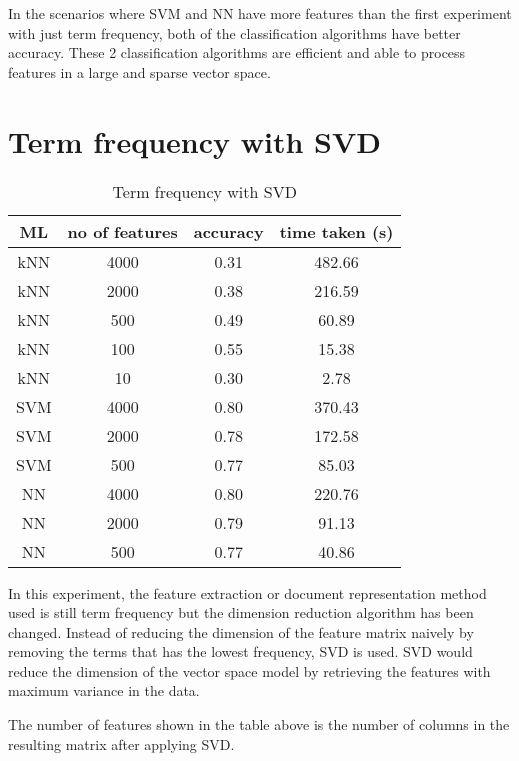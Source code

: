 In the scenarios where SVM and NN have more features than the first experiment with just term frequency, both of the classification algorithms have better accuracy. These 2 classification algorithms are efficient and able to process features in a large and sparse vector space.


\clearpage
\section{Term frequency with SVD}

\begin{table} [ht]
	\centering
	\begin{tabular}{|| c | c | c | c||}
		\hline
		ML & no of features & accuracy & time taken (s) \\ [0.5ex]
		\hline\hline
		kNN & 4000 & 0.31 & 482.66 \\
		\hline
		kNN & 2000 & 0.38 & 216.59 \\ 
		\hline
		kNN & 500 & 0.49 & 60.89 \\ 
		\hline
		kNN & 100 & 0.55 & 15.38 \\ 
		\hline
		kNN & 10 & 0.30 & 2.78 \\ 
		\hline\hline
		SVM & 4000 & 0.80 & 370.43 \\
		\hline
		SVM & 2000 & 0.78 & 172.58 \\
		\hline
		SVM & 500 & 0.77 & 85.03 \\
		\hline\hline
		NN & 4000 & 0.80 & 220.76 \\
		\hline
		NN & 2000 & 0.79 & 91.13 \\
		\hline
		NN & 500 & 0.77 & 40.86 \\
		\hline
	\end{tabular}
\caption{Term frequency with SVD}
\label{tbl:termFrequencySvd}
\end{table}

In this experiment, the feature extraction or document representation method used is still term frequency but the dimension reduction algorithm has been changed. Instead of reducing the dimension of the feature matrix naively by removing the terms that has the lowest frequency, SVD is used. SVD would reduce the dimension of the vector space model by retrieving the features with maximum variance in the data.

The number of features shown in the table above is the number of columns in the resulting matrix after applying SVD.

